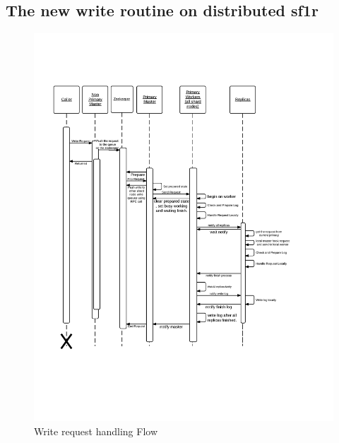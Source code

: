     
\subsection{The new write routine on distributed sf1r}

\begin{figure}[!ht]\centering
  \includegraphics[width=.90\textwidth]{Figures/WriteRequestProcess.png}
  \caption{Write request handling Flow}\label{fig:writeprocess}
\end{figure}

